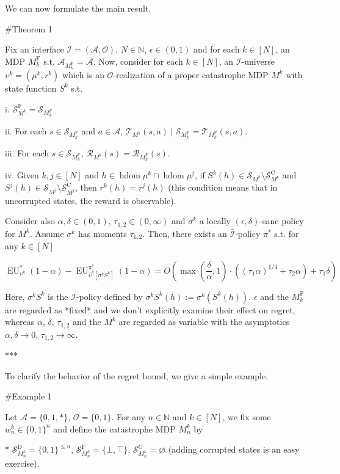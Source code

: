 \documentclass[a4paper]{article}
\newcommand{\Bool}{\{0,1\}}
\newcommand{\AP}[1]{\left(#1\right)}
\newcommand{\AB}[1]{\left[#1\right]}
\newcommand{\Nats}{\mathbb{N}}
\newcommand{\Ob}{\mathcal{O}}
\newcommand{\A}{\mathcal{A}}
\newcommand{\St}{\mathcal{S}}
\newcommand{\T}{\mathcal{T}}
\newcommand{\R}{\mathcal{R}}
\newcommand{\In}{\mathcal{I}}
\newcommand{\Adi}{{\bar{\In}}}
\DeclareMathOperator{\HD}{hdom}
\newcommand{\RMC}{\mathrm{C}}
\newcommand{\RMD}{\mathrm{D}}
\newcommand{\RMF}{\mathrm{F}}
\newcommand{\SF}{\St^{\RMF}}
\newcommand{\SD}{\St^{\RMD}}
\newcommand{\SC}{\St^{\RMC}}
\newcommand{\MF}{M^{\RMF}}
\newcommand{\EU}{\operatorname{EU}}
\begin{document}
We can now formulate the main result.

\#Theorem 1

Fix an interface $\In=(\A,\Ob)$, $N \in \Nats$, $\epsilon \in (0,1)$ and for each $k \in [N]$, an MDP $\MF_k$ s.t. $\A_{\MF_k} = \A$. Now, consider for each $k \in [N]$, an $\In$-universe $\upsilon^k=(\mu^k,r^k)$ which is an $\Ob$-realization of a proper catastrophe MDP $M^k$ with state function $S^k$ s.t.

i. $\SF_{M^k} = \St_{\MF_k}$

ii. For each $s \in \St_{\MF_k}$ and $a \in \A$, $\T_{M^k}(s,a) \mid \St_{\MF_k} = \T_{\MF_k}(s,a)$.

iii. For each $s \in \St_{\MF_k}$, $\R_{M^k}(s)=\R_{\MF_k}(s)$.

iv. Given $k,j \in [N]$ and $h \in \HD{\mu^k} \cap \HD{\mu^j}$, if $S^k(h) \in \St_{M^k} \setminus \SC_{M^k}$ and $S^j(h) \in \St_{M^j} \setminus \SC_{M^j}$, then $r^k(h)=r^j(h)$ (this condition means that in uncorrupted states, the reward is observable).

Consider also $\alpha,\delta\in(0,1)$, $\tau_{1,2} \in (0,\infty)$ and $\sigma^k$ a locally $(\epsilon,\delta)$-sane policy for $M^k$. Assume $\sigma^k$ has moments $\tau_{1,2}$. Then, there exists an $\Adi$-policy $\pi^*$ s.t. for any $k \in [N]$

$$\EU_{\upsilon^k}^*(1-\alpha) - \EU_{\bar{\upsilon}^k\AB{\sigma^kS^k}}^{\pi^*}(1-\alpha) = O\AP{\max\AP{\frac{\delta}{\alpha},1}\cdot\AP{(\tau_1 \alpha)^{1/4} + \tau_2 \alpha}+\tau_1\delta}$$

Here, $\sigma^k S^k$ is the $\In$-policy defined by $\sigma^k S^k(h):=\sigma^k\AP{S^k(h)}$. $\epsilon$ and the $\MF_k$ are regarded as *fixed* and we don't explicitly examine their effect on regret, whereas $\alpha$, $\delta$, $\tau_{1,2}$ and the $M^k$ are regarded as variable with the asymptotics $\alpha,\delta \rightarrow 0$, $\tau_{1,2} \rightarrow \infty$.

***

To clarify the behavior of the regret bound, we give a simple example.

\#Example 1

Let $\A = \{0,1,*\}$, $\Ob=\Bool$. For any $n \in \Nats$ and $k \in [N]$, we fix some $w_n^k \in \Bool^n$ and define the catastrophe MDP $M_n^k$ by

* $\SD_{M_n^k} = \Bool^{\leq n}$, $\SF_{M_n^k} = \{\bot,\top\}$, $\SC_{M_n^k} = \varnothing$ (adding corrupted states is an easy exercise).
\end{document}
